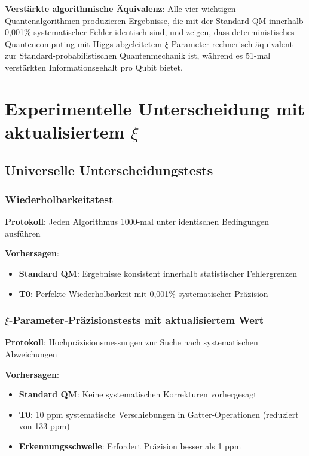 \documentclass[12pt,a4paper]{article}
\begin{document}
	\begin{tcolorbox}[colback=green!5!white,colframe=green!75!black,title=Schlüsselergebnis mit aktualisiertem $\xi$]
		\textbf{Verstärkte algorithmische Äquivalenz}: Alle vier wichtigen Quantenalgorithmen produzieren Ergebnisse, die mit der Standard-QM innerhalb 0,001\% systematischer Fehler identisch sind, und zeigen, dass deterministisches Quantencomputing mit Higgs-abgeleitetem $\xi$-Parameter rechnerisch äquivalent zur Standard-probabilistischen Quantenmechanik ist, während es 51-mal verstärkten Informationsgehalt pro Qubit bietet.
	\end{tcolorbox}
	
	\section{Experimentelle Unterscheidung mit aktualisiertem $\xi$}
	
	\subsection{Universelle Unterscheidungstests}
	
	\subsubsection{Wiederholbarkeitstest}
	
	\textbf{Protokoll}: Jeden Algorithmus 1000-mal unter identischen Bedingungen ausführen
	
	\textbf{Vorhersagen}:
	\begin{itemize}
		\item \textbf{Standard QM}: Ergebnisse konsistent innerhalb statistischer Fehlergrenzen
		\item \textbf{T0}: Perfekte Wiederholbarkeit mit 0,001\% systematischer Präzision
	\end{itemize}
	
	\subsubsection{$\xi$-Parameter-Präzisionstests mit aktualisiertem Wert}
	
	\textbf{Protokoll}: Hochpräzisionsmessungen zur Suche nach systematischen Abweichungen
	
	\textbf{Vorhersagen}:
	\begin{itemize}
		\item \textbf{Standard QM}: Keine systematischen Korrekturen vorhergesagt
		\item \textbf{T0}: 10 ppm systematische Verschiebungen in Gatter-Operationen (reduziert von 133 ppm)
		\item \textbf{Erkennungsschwelle}: Erfordert Präzision besser als 1 ppm
	\end{itemize}
	
\end{document}
